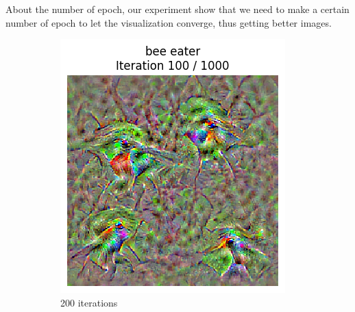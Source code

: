 About the number of epoch, our experiment show that we need to make a certain number of epoch to let the visualization converge, thus getting better images.
\begin{figure}[H]
    \centering
    \begin{subfigure}[t]{.25\textwidth}
        \centering
        \includegraphics[width=\linewidth]{figs/2b/SqueezeNet/SqueezeNet_bird_animated_1000_regpp_blur_100_frame.png}
        \caption{200 iterations}
        \label{fig:class_viz_iter:sub1}
    \end{subfigure}%
    \begin{subfigure}[t]{.25\textwidth}
        \centering

\end{subfigure}
\end{figure}
